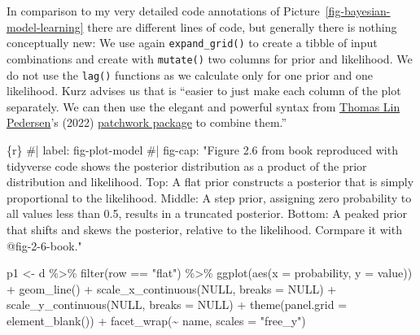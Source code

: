 \documentclass[
  letterpaper,
  DIV=11,
  numbers=noendperiod]{scrreprt}
\newenvironment{Shaded}{\begin{snugshade}}{\end{snugshade}}
\newcommand{\AttributeTok}[1]{\textcolor[rgb]{0.40,0.45,0.13}{#1}}
\newcommand{\CommentTok}[1]{\textcolor[rgb]{0.37,0.37,0.37}{#1}}
\newcommand{\ConstantTok}[1]{\textcolor[rgb]{0.56,0.35,0.01}{#1}}
\newcommand{\FunctionTok}[1]{\textcolor[rgb]{0.28,0.35,0.67}{#1}}
\newcommand{\InformationTok}[1]{\textcolor[rgb]{0.37,0.37,0.37}{#1}}
\newcommand{\NormalTok}[1]{\textcolor[rgb]{0.00,0.23,0.31}{#1}}
\newcommand{\OtherTok}[1]{\textcolor[rgb]{0.00,0.23,0.31}{#1}}
\newcommand{\SpecialCharTok}[1]{\textcolor[rgb]{0.37,0.37,0.37}{#1}}
\newcommand{\StringTok}[1]{\textcolor[rgb]{0.13,0.47,0.30}{#1}}
\begin{document}
In comparison to my very detailed code annotations of
Picture~\ref{fig-bayesian-model-learning} there are different lines of
code, but generally there is nothing conceptually new: We use again
\texttt{expand\_grid()} to create a tibble of input combinations and
create with \texttt{mutate()} two columns for prior and likelihood. We
do not use the \texttt{lag()} functions as we calculate only for one
prior and one likelihood. Kurz advises us that is ``easier to just make
each column of the plot separately. We can then use the elegant and
powerful syntax from \href{https://www.data-imaginist.com/}{Thomas Lin
Pedersen}'s (2022)
\href{https://patchwork.data-imaginist.com/}{patchwork package} to
combine them.''

\begin{Shaded}
\begin{Highlighting}[]
\InformationTok{\textasciigrave{}\textasciigrave{}\textasciigrave{}\{r\}}
\CommentTok{\#| label: fig{-}plot{-}model}
\CommentTok{\#| fig{-}cap: "Figure 2.6 from book reproduced with tidyverse code shows the posterior distribution as a product of the prior distribution and likelihood. Top: A flat prior constructs a posterior that is simply proportional to the likelihood. Middle: A step prior, assigning zero probability to all values less than 0.5, results in a truncated posterior. Bottom: A peaked prior that shifts and skews the posterior, relative to the likelihood. Cormpare it with @fig{-}2{-}6{-}book."}

\NormalTok{p1 }\OtherTok{\textless{}{-}}
\NormalTok{  d }\SpecialCharTok{\%\textgreater{}\%}
  \FunctionTok{filter}\NormalTok{(row }\SpecialCharTok{==} \StringTok{"flat"}\NormalTok{) }\SpecialCharTok{\%\textgreater{}\%} 
  \FunctionTok{ggplot}\NormalTok{(}\FunctionTok{aes}\NormalTok{(}\AttributeTok{x =}\NormalTok{ probability, }\AttributeTok{y =}\NormalTok{ value)) }\SpecialCharTok{+}
  \FunctionTok{geom\_line}\NormalTok{() }\SpecialCharTok{+}
  \FunctionTok{scale\_x\_continuous}\NormalTok{(}\ConstantTok{NULL}\NormalTok{, }\AttributeTok{breaks =} \ConstantTok{NULL}\NormalTok{) }\SpecialCharTok{+}
  \FunctionTok{scale\_y\_continuous}\NormalTok{(}\ConstantTok{NULL}\NormalTok{, }\AttributeTok{breaks =} \ConstantTok{NULL}\NormalTok{) }\SpecialCharTok{+}
  \FunctionTok{theme}\NormalTok{(}\AttributeTok{panel.grid =} \FunctionTok{element\_blank}\NormalTok{()) }\SpecialCharTok{+}
  \FunctionTok{facet\_wrap}\NormalTok{(}\SpecialCharTok{\textasciitilde{}}\NormalTok{ name, }\AttributeTok{scales =} \StringTok{"free\_y"}\NormalTok{)}


\end{Highlighting}
\end{Shaded}
\end{document}
